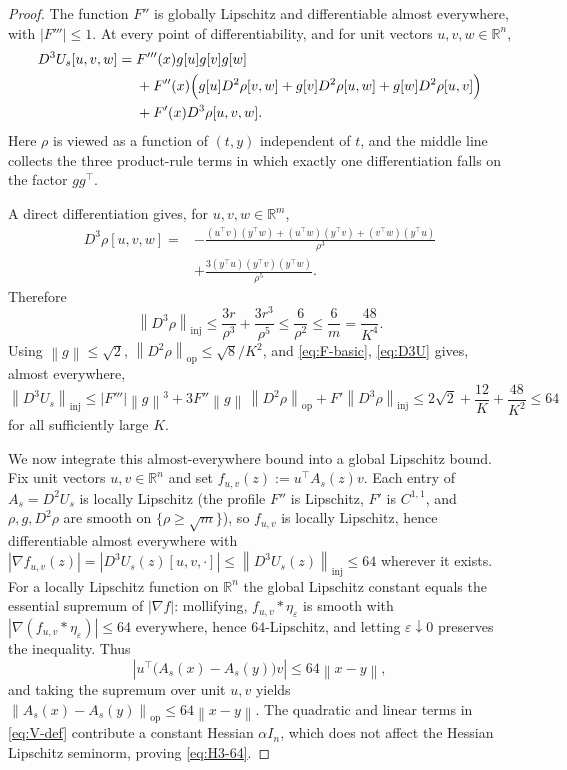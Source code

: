 \documentclass[11pt]{article}
\theoremstyle{plain}
\theoremstyle{definition}
\theoremstyle{remark}
\newcommand{\R}{\mathbb{R}}
\newcommand{\op}{\mathrm{op}}
\newcommand{\inj}{\mathrm{inj}}
\newcommand{\Id}{I}
\newcommand{\1}{\mathbf{1}}
\newcommand{\norm}[1]{\left\lVert #1\right\rVert}
\newcommand{\abs}[1]{\left\lvert #1\right\rvert}
\begin{document}
\begin{proof}
The function $F''$ is globally Lipschitz and differentiable almost
everywhere, with $\abs{F'''}\leq1$. At every point of differentiability,
and for unit vectors $u,v,w\in\R^n$,
\begin{align}
    D^3U_s[u,v,w]
    ={}&
    F'''(x)g[u]g[v]g[w]
    \nonumber\\
    &+
    F''(x)\Bigl(
        g[u]D^2\rho[v,w]
        +
        g[v]D^2\rho[u,w]
        +
        g[w]D^2\rho[u,v]
    \Bigr)
    \nonumber\\
    &+
    F'(x)D^3\rho[u,v,w].
    \label{eq:D3U}
\end{align}
Here $\rho$ is viewed as a function of $(t,y)$ independent of $t$, and the
middle line collects the three product-rule terms in which exactly one
differentiation falls on the factor $gg^\top$.

A direct differentiation gives, for $u,v,w\in\R^m$,
\begin{align}
    D^3\rho[u,v,w]
    ={}&
    -\frac{
        (u^\top v)(y^\top w)
        +(u^\top w)(y^\top v)
        +(v^\top w)(y^\top u)
    }{\rho^3}
    \nonumber\\
    &+
    \frac{
        3(y^\top u)(y^\top v)(y^\top w)
    }{\rho^5}.
    \label{eq:D3rho}
\end{align}
Therefore
\[
    \norm{D^3\rho}_{\inj}
    \leq
    \frac{3r}{\rho^3}+\frac{3r^3}{\rho^5}
    \leq
    \frac6{\rho^2}
    \leq
    \frac6m
    =
    \frac{48}{K^4}.
\]
Using $\norm g\leq\sqrt2$,
$\norm{D^2\rho}_{\op}\leq\sqrt8/K^2$, and
\eqref{eq:F-basic}, \eqref{eq:D3U} gives, almost everywhere,
\[
    \norm{D^3U_s}_{\inj}
    \leq
    \abs{F'''}\norm g^3
    +3F''\norm g\,\norm{D^2\rho}_{\op}
    +F'\norm{D^3\rho}_{\inj}
    \leq
    2\sqrt2+\frac{12}{K}+\frac{48}{K^2}
    \leq
    64
\]
for all sufficiently large $K$.

We now integrate this almost-everywhere bound into a global Lipschitz bound.
Fix unit vectors $u,v\in\R^n$ and set
$f_{u,v}(z):=u^\top A_s(z)v$. Each entry of $A_s=D^2U_s$ is locally Lipschitz
(the profile $F''$ is Lipschitz, $F'$ is $C^{1,1}$, and $\rho,g,D^2\rho$ are
smooth on $\{\rho\geq\sqrt m\}$), so $f_{u,v}$ is locally Lipschitz, hence
differentiable almost everywhere with
$\abs{\nabla f_{u,v}(z)}=\abs{D^3U_s(z)[u,v,\cdot]}\leq\norm{D^3U_s(z)}_{\inj}
\leq64$ wherever it exists. For a locally Lipschitz function on $\R^n$ the
global Lipschitz constant equals the essential supremum of $\abs{\nabla f}$:
mollifying, $f_{u,v}*\eta_\varepsilon$ is smooth with
$\abs{\nabla(f_{u,v}*\eta_\varepsilon)}\leq64$ everywhere, hence
$64$-Lipschitz, and letting $\varepsilon\downarrow0$ preserves the
inequality. Thus
\[
    \abs{u^\top\bigl(A_s(x)-A_s(y)\bigr)v}\leq64\norm{x-y},
\]
and taking the supremum over unit $u,v$ yields
$\norm{A_s(x)-A_s(y)}_{\op}\leq64\norm{x-y}$. The quadratic and linear terms
in \eqref{eq:V-def} contribute a constant Hessian $\alpha\Id_n$, which does
not affect the Hessian Lipschitz seminorm, proving \eqref{eq:H3-64}.
\end{proof}
\end{document}

